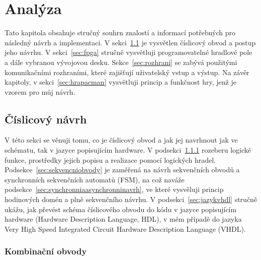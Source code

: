 \documentclass{report}
\begin{document}
\chapter{Analýza}\label{sec:analyzachap}
Tato kapitola obsahuje stručný souhrn znalostí a informací potřebných pro následný návrh a implementaci. V sekci~\ref{sec:cislicovynavrh} je vysvětlen číslicový obvod a postup jeho návrhu. V sekci~\ref{sec:fpga} stručně vysvětluji programovatelné hradlové pole a dále vybranou vývojovou desku. Sekce~\ref{sec:rozhrani} se zabývá použitými komunikačními rozhraními, které zajišťují uživatelský vstup a výstup. Na závěr kapitoly, v sekci~\ref{sec:hrapacman} vysvětluji princip a funkčnost hry, jenž je vzorem pro můj návrh.

\section{Číslicový návrh}\label{sec:cislicovynavrh}
V této sekci se věnuji tomu, co je číslicový obvod a jak jej navrhnout jak ve schématu, tak v jazyce popisujícím hardware. V podsekci~\ref{sec:kombinacniobvody} rozeberu logické funkce, prostředky jejich popisu a realizace pomocí logických hradel. Podsekce~\ref{sec:sekvencniobvody}  je zaměřená na návrh sekvenčních obvodů a synchronních sekvenčních automatů (FSM), na což naváže podsekce~\ref{sec:synchronniaasynchronninavrh}, ve které vysvěluji princip hodinových domén a plně sekvenčního návrhu. V podsekci~\ref{sec:jazykvhdl} stručně ukážu, jak převést schéma číslicového obvodu do kódu v jazyce popisujícím hardware (Hardware Description Language, HDL), v mém případě do jazyka Very High Speed Integrated Circuit Hardware Description Language (VHDL).


\subsection{Kombinační obvody}\label{sec:kombinacniobvody}
\end{document}
